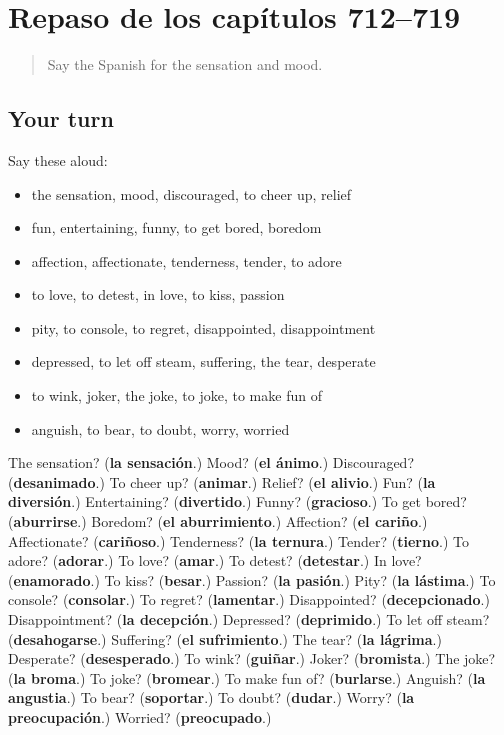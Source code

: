 \section[(dialogue)]{Repaso de los capítulos 712–719}

\label{lesson:ES-R719-repaso-712-719}



\begin{quote}
Say the Spanish for the sensation and mood.
\end{quote}

\subsection*{Your turn}
Say these aloud:

\begin{itemize}
\raggedright
  \item the sensation, mood, discouraged, to cheer up, relief
  \item fun, entertaining, funny, to get bored, boredom
  \item affection, affectionate, tenderness, tender, to adore
  \item to love, to detest, in love, to kiss, passion
  \item pity, to console, to regret, disappointed, disappointment
  \item depressed, to let off steam, suffering, the tear, desperate
  \item to wink, joker, the joke, to joke, to make fun of
  \item anguish, to bear, to doubt, worry, worried
\end{itemize}

\begin{tcolorbox}[breakable,colback=teal!4,colframe=teal!35!black,title={Before you move on}]
The sensation? (\textbf{la sensación}.) Mood? (\textbf{el ánimo}.) Discouraged? (\textbf{desanimado}.) To cheer up? (\textbf{animar}.) Relief? (\textbf{el alivio}.) Fun? (\textbf{la diversión}.) Entertaining? (\textbf{divertido}.) Funny? (\textbf{gracioso}.) To get bored? (\textbf{aburrirse}.) Boredom? (\textbf{el aburrimiento}.) Affection? (\textbf{el cariño}.) Affectionate? (\textbf{cariñoso}.) Tenderness? (\textbf{la ternura}.) Tender? (\textbf{tierno}.) To adore? (\textbf{adorar}.) To love? (\textbf{amar}.) To detest? (\textbf{detestar}.) In love? (\textbf{enamorado}.) To kiss? (\textbf{besar}.) Passion? (\textbf{la pasión}.) Pity? (\textbf{la lástima}.) To console? (\textbf{consolar}.) To regret? (\textbf{lamentar}.) Disappointed? (\textbf{decepcionado}.) Disappointment? (\textbf{la decepción}.) Depressed? (\textbf{deprimido}.) To let off steam? (\textbf{desahogarse}.) Suffering? (\textbf{el sufrimiento}.) The tear? (\textbf{la lágrima}.) Desperate? (\textbf{desesperado}.) To wink? (\textbf{guiñar}.) Joker? (\textbf{bromista}.) The joke? (\textbf{la broma}.) To joke? (\textbf{bromear}.) To make fun of? (\textbf{burlarse}.) Anguish? (\textbf{la angustia}.) To bear? (\textbf{soportar}.) To doubt? (\textbf{dudar}.) Worry? (\textbf{la preocupación}.) Worried? (\textbf{preocupado}.)
\end{tcolorbox}
